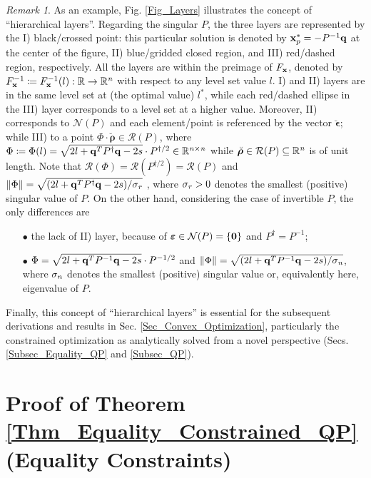 \documentclass[9pt,twocolumn,twoside,lineno]{pnas-new-1}
\newcommand{\bfx}{{\bf x}}
\newcommand{\bfq}{{\bf q}}
\newcommand{\bfepsilon}{{\boldsymbol \epsilon}}
\newcommand{\bfrho}{{\boldsymbol \rho}}
\newcommand{\bfvarepsilon}{{\boldsymbol \varepsilon}}
\newcommand{\bfzero}{{\bf 0}}
\newcommand{\real}{\mathbb{R}}
\newcommand{\calN}{{\mathcal N}}
\newcommand{\calR}{{\mathcal R}}
\newcommand{\itn}{{\it n}}
\newcommand{\itr}{{\it r}}
\theoremstyle{remark}
\newtheorem{remark}{Remark}[section]
\begin{document}
\begin{remark}
As an example, Fig. \ref{Fig_Layers} illustrates the concept of ``hierarchical layers''. Regarding the singular $P$, the three layers are represented by the I) black/crossed point: this particular solution is denoted by $\bfx_p^*=-P^{-1}\bfq$ at the center of the figure, II) blue/gridded closed region, and III) red/dashed region, respectively. All the layers are within the preimage of $F_\bfx$, denoted by $F_\bfx^{-1}\coloneqq F_\bfx^{-1}(l):\real\rightarrow\real^\itn$ with respect to any level set value $l$. I) and II) layers are in the same level set at (the optimal value) $l^*$, while each red/dashed ellipse in the III) layer corresponds to a level set at a higher value. Moreover, II) corresponds to $\calN(P)$ and each element/point is referenced by the vector $\breve\bfepsilon$; while III) to a point $\Phi\cdot\breve\bfrho\in\calR(P)$, where $\Phi\coloneqq\Phi(l)=\sqrt{2l+\bfq^TP^\dagger\bfq-2s}\cdot P^{\dagger/2}\in\real^{\itn\times\itn}$ while $\breve\bfrho\in\calR(P)\subseteq\real^\itn$ is of unit length. Note that $\calR(\Phi)=\calR(P^{\dagger/2})=\calR(P)$ and $\Vert\Phi\Vert=\sqrt{(2l+\bfq^TP^\dagger\bfq-2s)/\sigma_\itr}$ \citep{GoVa:13}, where $\sigma_\itr>0$ denotes the smallest (positive) singular value of $P$. On the other hand, considering the case of invertible $P$, the only differences are
\begin{enumerate}
\item[$\bullet$] the lack of II) layer, because of $\bfvarepsilon\in\calN(P)=\{\bfzero\}$ and $P^\dagger=P^{-1}$;
\item[$\bullet$] $\Phi=\sqrt{2l+\bfq^TP^{-1}\bfq-2s}\cdot P^{-1/2}$ and $\Vert\Phi\Vert=\sqrt{(2l+\bfq^TP^{-1}\bfq-2s)/\sigma_\itn}$, where $\sigma_\itn$ denotes the smallest (positive) singular value or, equivalently here, eigenvalue of $P$.
\end{enumerate}
Finally, this concept of ``hierarchical layers'' is essential for the subsequent derivations and results in Sec. \ref{Sec_Convex_Optimization}, particularly the constrained optimization as analytically solved from a novel perspective (Secs. \ref{Subsec_Equality_QP} and \ref{Subsec_QP}).
\label{Rem_Fig_Geometric_Layers}
\end{remark}

\section{Proof of Theorem \ref{Thm_Equality_Constrained_QP} (Equality Constraints)}
\label{App_Proof_Equality_Constrained_QP}
\end{document}
